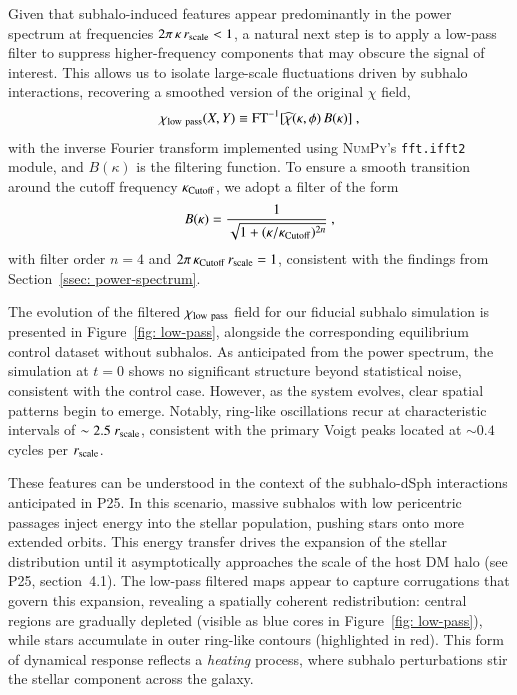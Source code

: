 \documentclass[fleqn,usenatbib]{mnras}
\begin{document}
Given that subhalo-induced features appear predominantly in the power spectrum at frequencies $2 \pi \, \kappa \, r_{\rm scale} < 1$, a natural next step is to apply a low-pass filter to suppress higher-frequency components that may obscure the signal of interest. This allows us to isolate large-scale fluctuations driven by subhalo interactions, recovering a smoothed version of the original $\chi$ field,
\begin{equation} \label{eq: low-pass}
\chi_{\rm low~pass}(X,Y) \equiv {\rm FT}^{-1}[\widehat{\chi}(\kappa, \phi) \, B(\kappa)] \ ,
\end{equation}
%
with the inverse Fourier transform implemented using \textsc{NumPy}'s \texttt{fft.ifft2} module, and $B(\kappa)$ is the filtering function. To ensure a smooth transition around the cutoff frequency $\kappa_{\rm Cutoff}$, we adopt a \cite{Butterworth30} filter of the form
\begin{equation} \label{eq: butterworth}
B(\kappa) = \frac{1}{\sqrt{1 + (\kappa / \kappa_{\rm Cutoff})^{2n}}} \ ,
\end{equation}
%
with filter order $n = 4$ and $2 \pi \, \kappa_{\rm Cutoff} \, r_{\rm scale} = 1$, consistent with the findings from Section~\ref{ssec: power-spectrum}.

The evolution of the filtered $\chi_{\rm low~pass}$ field for our fiducial subhalo simulation is presented in Figure~\ref{fig: low-pass}, alongside the corresponding equilibrium control dataset without subhalos. As anticipated from the power spectrum, the simulation at $t = 0$ shows no significant structure beyond statistical noise, consistent with the control case. However, as the system evolves, clear spatial patterns begin to emerge. Notably, ring-like oscillations recur at characteristic intervals of $\sim 2.5~r_{\rm scale}$, consistent with the primary Voigt peaks located at $\sim 0.4$ cycles per $r_{\rm scale}$.

These features can be understood in the context of the subhalo-dSph interactions anticipated in P25. In this scenario, massive subhalos with low pericentric passages inject energy into the stellar population, pushing stars onto more extended orbits. This energy transfer drives the expansion of the stellar distribution until it asymptotically approaches the scale of the host DM halo (see P25, section~4.1). The low-pass filtered maps appear to capture corrugations that govern this expansion, revealing a spatially coherent redistribution: central regions are gradually depleted (visible as blue cores in Figure~\ref{fig: low-pass}), while stars accumulate in outer ring-like contours (highlighted in red). This form of dynamical response reflects a \textit{heating} process, where subhalo perturbations stir the stellar component across the galaxy.
\end{document}
